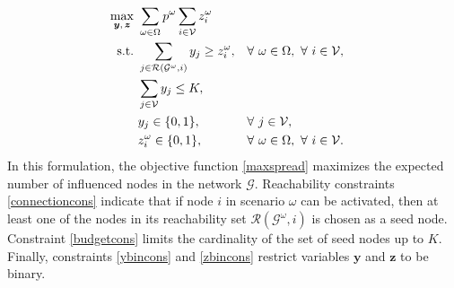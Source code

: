 \documentclass[a4paper,10pt]{article}
\theoremstyle{plain}
\newcommand{\revv}[1]{{#1}}
\begin{document}
	\begin{subequations}\label{IMP}
		\begin{align}
			\max_{\boldsymbol{y},\,\boldsymbol{z}}\ & \sum_{\omega\in\Omega}p^{\omega}\sum_{i\in\mathcal{V}}z_i^{\omega} \label{maxspread}\\
			\hbox{s.t.}\ & \sum_{j\in \mathcal{R}(\mathcal{G}^{\omega},i)} y_j\geq z_i^{\omega},&&\forall ~\omega\in\Omega,~\forall ~i\in \mathcal{V}, \label{connectioncons} \\
			& \sum_{j\in \mathcal{V}}y_j \leq K, &&\label{budgetcons}\\
			& y_j \in\{0,1\} \label{ybincons}, &&  \forall ~j\in \mathcal{V},\\
			& z_i^{\omega} \in \{0,1\} \label{zbincons}, && \forall~ \omega\in\Omega,~\forall~ i\in \mathcal{V}.
		\end{align}
	\end{subequations}
	In this formulation, the objective function \eqref{maxspread} maximizes the expected number of influenced nodes in the \revv{network} $\mathcal{G}$.
	Reachability constraints \eqref{connectioncons} indicate that if node $i$ in scenario $\omega$  can be activated, then at least one of the nodes in its reachability set $\mathcal{R}(\mathcal{G}^{\omega},i)$ is chosen as a seed node. 
	Constraint \eqref{budgetcons} limits the cardinality of the set of seed nodes up to $K$. 
	Finally, constraints \eqref{ybincons} and \eqref{zbincons} restrict variables $\boldsymbol{y}$ and $\boldsymbol{z}$ to be binary.
	
\end{document}
